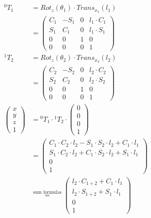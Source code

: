 \documentclass[a4paper,11pt]{article}
\begin{document}
\begin {enumerate}
\begin{enumerate}
				\begin{align*}
					{^0T_1} &= Rot_{z}(\theta_1) \cdot Trans_{x_1}(l_1)\\
					&= \begin{pmatrix}
						C_1 & -S_1 & 0 & l_1 \cdot C_1\\
						S_1 & C_1 & 0 & l_1 \cdot S_1\\
						0 & 0 & 1 & 0\\
						0 & 0 & 0 & 1
					\end{pmatrix}\\
					{^1T_2} &= Rot_{z}(\theta_2) \cdot Trans_{x_2}(l_2)\\
					&= \begin{pmatrix}
						C_2 & -S_2 & 0 & l_2 \cdot C_2\\
						S_2 & C_2 & 0 & l_2 \cdot S_2\\
						0 & 0 & 1 & 0\\
						0 & 0 & 0 & 1
					\end{pmatrix}\\
					\begin{pmatrix}
						x \\
						y \\
						z \\
						1
					\end{pmatrix} &= {^0T_1} \cdot {^1T_2} \cdot \begin{pmatrix}
						0 \\
						0 \\
						0 \\
						1
					\end{pmatrix}\\
					&= \begin{pmatrix}
						C_1 \cdot C_2 \cdot l_2 - S_1 \cdot S_2 \cdot l_2 + C_1 \cdot l_1\\
						S_1 \cdot C_2 \cdot l_2 + C_1 \cdot S_2 \cdot l_2 + S_1 \cdot l_1\\
						0 \\
						1
					\end{pmatrix}\\
					&\overset{\text{sum formulas}}{=} \begin{pmatrix}
						l_2 \cdot C_{1+2} + C_1 \cdot l_1\\
						l_2 \cdot S_{1+2} + S_1 \cdot l_1\\
						0 \\
						1
					\end{pmatrix}\\
				\end{align*}
				

\end{enumerate}
\end{enumerate}
\end{document}
